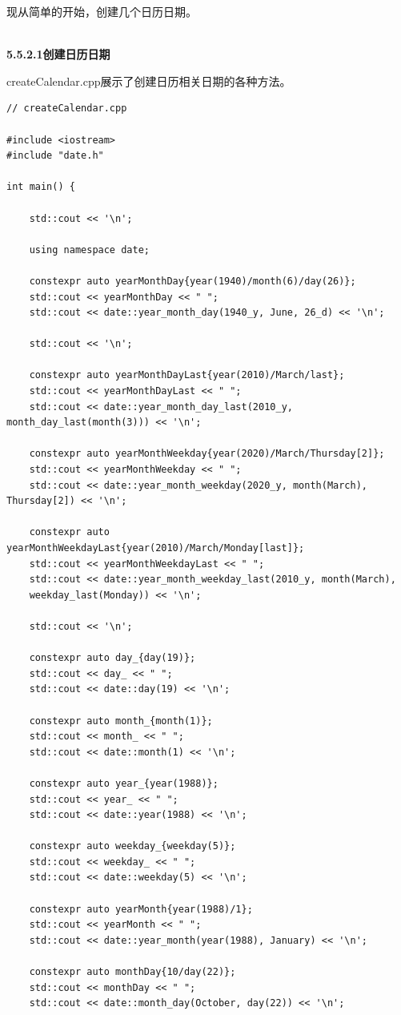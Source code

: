 现从简单的开始，创建几个日历日期。

\hspace*{\fill} \\ %
\noindent
\textbf{5.5.2.1\hspace{0.2cm}创建日历日期}

createCalendar.cpp展示了创建日历相关日期的各种方法。

\begin{lstlisting}[style=styleCXX]
// createCalendar.cpp

#include <iostream>
#include "date.h"

int main() {

	std::cout << '\n';
	
	using namespace date;
	
	constexpr auto yearMonthDay{year(1940)/month(6)/day(26)};
	std::cout << yearMonthDay << " ";
	std::cout << date::year_month_day(1940_y, June, 26_d) << '\n';
	
	std::cout << '\n';
	
	constexpr auto yearMonthDayLast{year(2010)/March/last};
	std::cout << yearMonthDayLast << " ";
	std::cout << date::year_month_day_last(2010_y, month_day_last(month(3))) << '\n';
	
	constexpr auto yearMonthWeekday{year(2020)/March/Thursday[2]};
	std::cout << yearMonthWeekday << " ";
	std::cout << date::year_month_weekday(2020_y, month(March), Thursday[2]) << '\n';
	
	constexpr auto yearMonthWeekdayLast{year(2010)/March/Monday[last]};
	std::cout << yearMonthWeekdayLast << " ";
	std::cout << date::year_month_weekday_last(2010_y, month(March),
	weekday_last(Monday)) << '\n';
	
	std::cout << '\n';
	
	constexpr auto day_{day(19)};
	std::cout << day_ << " ";
	std::cout << date::day(19) << '\n';
	
	constexpr auto month_{month(1)};
	std::cout << month_ << " ";
	std::cout << date::month(1) << '\n';
	
	constexpr auto year_{year(1988)};
	std::cout << year_ << " ";
	std::cout << date::year(1988) << '\n';
	
	constexpr auto weekday_{weekday(5)};
	std::cout << weekday_ << " ";
	std::cout << date::weekday(5) << '\n';
	
	constexpr auto yearMonth{year(1988)/1};
	std::cout << yearMonth << " ";
	std::cout << date::year_month(year(1988), January) << '\n';
	
	constexpr auto monthDay{10/day(22)};
	std::cout << monthDay << " ";
	std::cout << date::month_day(October, day(22)) << '\n';
	

\end{lstlisting}
